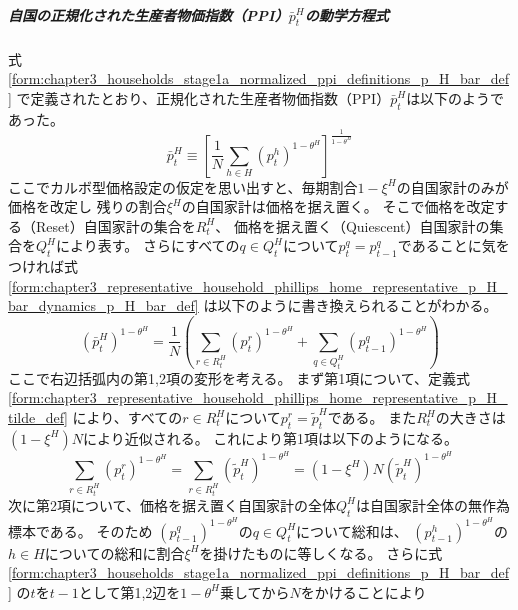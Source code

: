 \subparagraph{自国の正規化された生産者物価指数（PPI）\(\bar{p}_t^H\)の動学方程式}
\label{sec:chapter3_representative_household_phillips_home_representative_p_H_bar_dynamics}
式
\eqref{form:chapter3_households_stage1a_normalized_ppi_definitions_p_H_bar_def}
で定義されたとおり、正規化された生産者物価指数（PPI）\(\bar{p}_t^H\)は以下のようであった。
\begin{equation}
\label{form:chapter3_representative_household_phillips_home_representative_p_H_bar_dynamics_p_H_bar_def}
    \bar{p}_t^H
    \equiv\left[\frac{1}{N}\sum_{h\in H}(p_t^{h})^{1-\theta^H}\right]^{\frac{1}{1-\theta^H}}
\end{equation}
ここでカルボ型価格設定の仮定を思い出すと、毎期割合\(1-\xi^H\)の自国家計のみが価格を改定し
残りの割合\(\xi^H\)の自国家計は価格を据え置く。
そこで価格を改定する（Reset）自国家計の集合を\(R_t^H\)、
価格を据え置く（Quiescent）自国家計の集合を\(Q_t^H\)により表す。
さらにすべての\(q\in Q_t^H\)について\(p_t^q=p_{t-1}^q\)であることに気をつければ式
\eqref{form:chapter3_representative_household_phillips_home_representative_p_H_bar_dynamics_p_H_bar_def}
は以下のように書き換えられることがわかる。
\begin{equation}
\label{form:chapter3_representative_household_phillips_home_representative_p_H_bar_dynamics_p_H_bar_modified_eq}
    (\bar{p}_t^H)^{1-\theta^H}
    =\frac{1}{N}
     \left(\sum_{r\in R_t^H}(p_t^r)^{1-\theta^H}+\sum_{q\in Q_t^H}(p_{t-1}^q)^{1-\theta^H}\right)
\end{equation}
ここで右辺括弧内の第1,2項の変形を考える。
まず第1項について、定義式
\eqref{form:chapter3_representative_household_phillips_home_representative_p_H_tilde_def}
により、すべての\(r\in R_t^H\)について\(p_t^r=\widetilde{p}_t^H\)である。
また\(R_t^H\)の大きさは\((1-\xi^H)N\)により近似される。
これにより第1項は以下のようになる。
\begin{equation}
\label{form:chapter3_representative_household_phillips_home_representative_p_H_bar_dynamics_p_H_bar_modified_first_term_eq}
    \sum_{r\in R_t^H}(p_t^r)^{1-\theta^H}
    =\sum_{r\in R_t^H}(\widetilde{p}_t^H)^{1-\theta^H}
    =(1-\xi^H)N(\widetilde{p}_t^H)^{1-\theta^H}
\end{equation}
次に第2項について、価格を据え置く自国家計の全体\(Q_t^H\)は自国家計全体の無作為標本である。
そのため
\((p_{t-1}^q)^{1-\theta^H}\)の\(q\in Q_t^H\)について総和は、
\((p_{t-1}^h)^{1-\theta^H}\)の\(h\in H\)についての総和に割合\(\xi^H\)を掛けたものに等しくなる。
さらに式
\eqref{form:chapter3_households_stage1a_normalized_ppi_definitions_p_H_bar_def}
の\(t\)を\(t-1\)として第1,2辺を\({1-\theta^H}\)乗してから\(N\)をかけることにより
